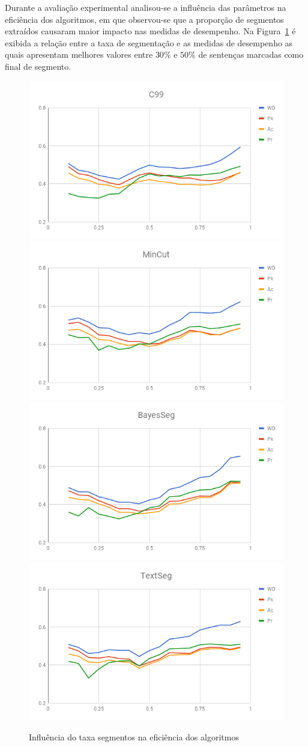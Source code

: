 Durante a avaliação experimental analisou-se a influência das parâmetros na eficiência dos algoritmos, em que observou-se que a proporção de segmentos extraídos causaram maior impacto nas medidas de desempenho. Na Figura~\ref{fig:influencia-SegRate} é exibida a relação entre a taxa de segmentação e as medidas de desempenho as quais apresentam melhores valores entre $30\%$ e $50\%$ de sentenças marcadas como final de segmento.



\begin{figure}[!h] \centering     %

	  \includegraphics[width=.48\textwidth]{conteudo/capitulos/figs/graficos/analiseNSegRate-C99.png}
	  \includegraphics[width=.48\textwidth]{conteudo/capitulos/figs/graficos/analiseNSegRate-MinCut.png}
	  \includegraphics[width=.48\textwidth]{conteudo/capitulos/figs/graficos/analiseNSegRate-Bayes.png}
	  \includegraphics[width=.48\textwidth]{conteudo/capitulos/figs/graficos/analiseNSegRate-UISeg.png}
	\caption{Influência do taxa segmentos na eficiência dos algoritmos}
	\label{fig:influencia-SegRate}
\end{figure}




